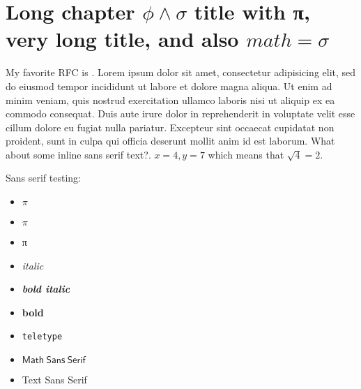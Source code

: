 \chapter{Long chapter \texorpdfstring{$\phi \land \sigma$}{phi and sigma} title with π, very long title, and also \texorpdfstring{$math = \sigma$}{math = sigma}}

My favorite RFC is \cite{rfc2549}.
Lorem ipsum dolor sit amet, consectetur adipisicing elit, sed do eiusmod tempor incididunt ut labore et dolore magna aliqua. Ut enim ad minim veniam, quis nostrud exercitation ullamco laboris nisi ut aliquip ex ea commodo consequat. Duis aute irure dolor in reprehenderit in voluptate velit esse cillum dolore eu fugiat nulla pariatur. Excepteur sint occaecat cupidatat non proident, sunt in culpa qui officia deserunt mollit anim id est laborum. \textsf{What about some inline sans serif text?}. $x = 4, y= 7$ which means that $\sqrt{4} = 2$.

Sans serif testing:
\begin{itemize}
    \item \textsf{$\pi$}
    \item \textsf{$π$}
    \item \textsf{π}
    \item \textsf{\emph{italic}}
    \item \textsf{\textbf{\emph{bold italic}}}
    \item \textsf{\textbf{bold}}
    \item \textsf{\texttt{teletype}}
    \item $\mathsf{Math\ Sans\ Serif}$
    \item \textsf{Text Sans Serif}
\end{itemize}
